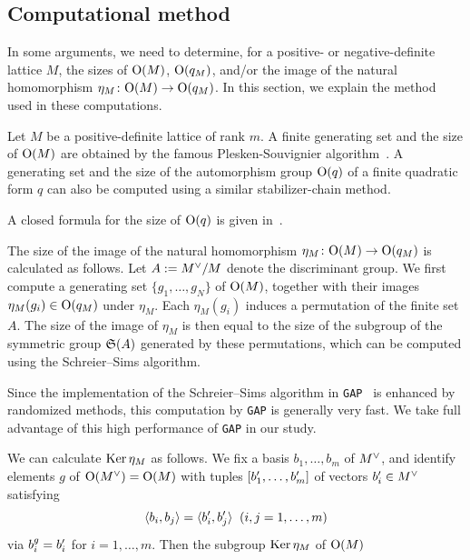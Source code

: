 \documentclass{amsart} %
\begin{document}
\subsection{Computational method}\label{subsec:computational}
%
In some arguments, 
we need to determine, for a positive- or negative-definite lattice $M$,  the sizes of $\mathord{\mathrm{O}}(M)$,
$\mathord{\mathrm{O}}(q_M)$, and/or 
the image of the natural homomorphism
$\eta_M\colon \mathord{\mathrm{O}}(M) \to \mathord{\mathrm{O}}(q_M)$.
In this section, we explain the method used in these computations.
%
\par
%
Let $M$ be a positive-definite lattice of rank $m$.
A finite generating set 
and the size of $\mathord{\mathrm{O}}(M)$ are obtained by the famous Plesken-Souvignier algorithm~\cite{MR1484483}.
A generating set and the size of the automorphism group $\mathord{\mathrm{O}}(q)$ of a finite quadratic form 
$q$ can also be computed using a similar stabilizer-chain method.
%
\begin{remark}
A closed formula for the size of $\mathord{\mathrm{O}}(q)$ is given in~\cite[Theorem 5.2]{MR4730253}.
\end{remark}
%
%
The size of the image of 
the natural homomorphism $\eta_M\colon \mathord{\mathrm{O}}(M)\to \mathord{\mathrm{O}}(q_M)$ is calculated as follows.
Let $A:=M^{\vee}/M$ denote the discriminant group.
We first compute a generating set $\{g_1, \dots, g_N\}$ of $\mathord{\mathrm{O}}(M)$,
together with their images $\eta_M(g_i)\in \mathord{\mathrm{O}}(q_M)$ under $\eta_M$.
Each $\eta_M(g_i)$ induces a permutation of the finite set $A$.
The size of the image of $\eta_M$ is 
then equal to the size of the subgroup of 
the symmetric group $\mathord{\mathfrak{S}}(A)$ generated by these permutations,
which can be computed using the Schreier--Sims algorithm.
%
\begin{remark}\label{rem:GAPadvantage}
Since the implementation of the Schreier--Sims algorithm in {\tt GAP}~\cite{GAP4} is enhanced by randomized methods,
this computation by {\tt GAP} is generally very fast.
We take full advantage of this high performance of {\tt GAP} in our study.
\end{remark}
%
We can calculate  $\operatorname{Ker} \eta_M$
as follows.
We fix a basis 
$b_1, \dots, b_{m}$ of $M^{\vee}$, 
and identify elements $g$ of $\mathord{\mathrm{O}}(M^{\vee})=\mathord{\mathrm{O}}(M)$
with tuples $[b_1^{\prime}, \dots, b_{m}^{\prime}]$ of vectors 
$b_i^{\prime}\in M^{\vee}$
satisfying
\[
\langle b_i, b_j \rangle=\langle b_i^{\prime}, b_j^{\prime} \rangle \;\;(i, j=1, \dots, m)
\]
via $b_i^g=b_i^{\prime}$ for $i=1, \dots, m$.
Then 
the subgroup
$\operatorname{Ker} \eta_M$ of $\mathord{\mathrm{O}}(M)$
\end{document}
